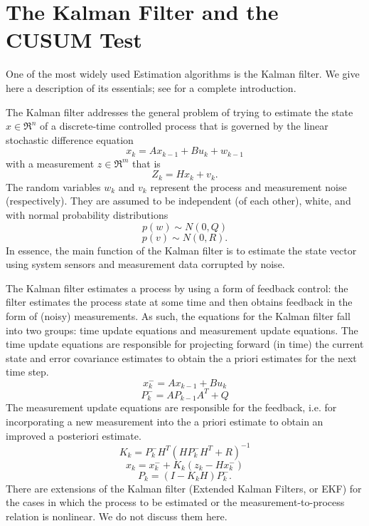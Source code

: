 
\section{The Kalman Filter and the CUSUM Test}
\label{Skalmancusum}

One of the most widely used Estimation algorithms is the Kalman filter. We give here a description
of its essentials; see \cite{welch} for a complete introduction.

The Kalman filter addresses the general problem of trying to estimate the state $x \in \Re^n$ 
of a discrete-time controlled process that is governed by the linear stochastic difference equation
$$x_k=Ax_{k-1} + B u_k + w_{k-1}$$
with a measurement $z \in \Re^m$ that is
$$Z_k = H x_k + v_k.$$
%
The random variables $w_k$ and $v_k$ represent the process and measurement noise
(respectively). They are assumed to be independent (of each other), white, and with
normal probability distributions
$$p(w) \sim N(0,Q) $$
$$p(v) \sim N(0,R). $$
%
In essence, the main function of the Kalman filter is to estimate the state vector 
using system sensors and measurement data  corrupted by noise.

The Kalman filter estimates a process by using a form of feedback control: the filter
estimates the process state at some time and then obtains feedback in the form of (noisy)
measurements. As such, the equations for the Kalman filter fall into two groups: time
update equations and measurement update equations. The time update equations are
responsible for projecting forward (in time) the current state and error covariance
estimates to obtain the a priori estimates for the next time step. 
$$x^-_k=A x_{k-1} + B u_k$$
$$P^-_k= AP_{k-1} A^T +Q$$
%
The measurement update equations are responsible for the feedback, i.e. for 
incorporating a new measurement into the a priori estimate to obtain an improved a posteriori estimate.
%
$$K_k=P^-_k H^T(H P^-_kH^T+R)^{-1}$$
$$ x_k=x_k^- + K_k(z_k -Hx_k^-)$$
$$P_k=(I-K_k H) P^-_k.$$
%
There are extensions of the Kalman filter (Extended Kalman Filters, or EKF)
for the cases in which the process to be estimated or the measurement-to-process
relation is nonlinear. We do not discuss them here. 

